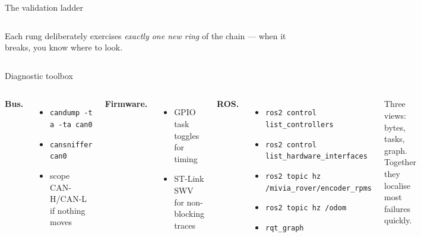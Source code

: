 \begin{frame}{The validation ladder}
\begin{columns}[T,onlytextwidth]
      \vspace{0.6em}
      \footnotesize\textcolor{black!60}{Each rung deliberately exercises
      \emph{exactly one new ring} of the chain — when it breaks, you know
      where to look.}
  \end{columns}
\end{frame}

\begin{frame}[fragile]{Diagnostic toolbox}
  \begin{columns}[T,onlytextwidth]
      \textbf{Bus.}
      \begin{itemize}\setlength\itemsep{2pt}
        \item \texttt{candump -t a -ta can0}
        \item \texttt{cansniffer can0}
        \item scope CAN-H/CAN-L if nothing moves
      \end{itemize}

      \vspace{0.5em}
      \textbf{Firmware.}
      \begin{itemize}\setlength\itemsep{2pt}
        \item GPIO task toggles for timing
        \item ST-Link SWV for non-blocking traces
      \end{itemize}

      \textbf{ROS.}
      \begin{itemize}\setlength\itemsep{2pt}
        \item \texttt{ros2 control list\_controllers}
        \item \texttt{ros2 control list\_hardware\_interfaces}
        \item \texttt{ros2 topic hz /mivia\_rover/encoder\_rpms}
        \item \texttt{ros2 topic hz /odom}
        \item \texttt{rqt\_graph}
      \end{itemize}

      \vspace{0.6em}
      \footnotesize\textcolor{black!60}{Three views: bytes, tasks, graph.
      Together they localise most failures quickly.}
  \end{columns}
\end{frame}